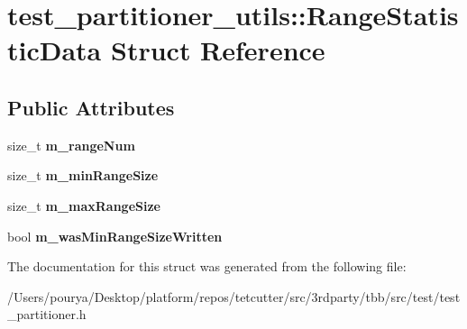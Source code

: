 \hypertarget{structtest__partitioner__utils_1_1RangeStatisticData}{}\section{test\+\_\+partitioner\+\_\+utils\+:\+:Range\+Statistic\+Data Struct Reference}
\label{structtest__partitioner__utils_1_1RangeStatisticData}
\subsection*{Public Attributes}
\begin{DoxyCompactItemize}
\item 
\hypertarget{structtest__partitioner__utils_1_1RangeStatisticData_acbd223919b9488c4636c5a5becd59654}{}size\+\_\+t {\bfseries m\+\_\+range\+Num}\label{structtest__partitioner__utils_1_1RangeStatisticData_acbd223919b9488c4636c5a5becd59654}

\item 
\hypertarget{structtest__partitioner__utils_1_1RangeStatisticData_a5c2324aa5479b0d7a06903d340089436}{}size\+\_\+t {\bfseries m\+\_\+min\+Range\+Size}\label{structtest__partitioner__utils_1_1RangeStatisticData_a5c2324aa5479b0d7a06903d340089436}

\item 
\hypertarget{structtest__partitioner__utils_1_1RangeStatisticData_a2831576fcb7505a8427563eeb9765be3}{}size\+\_\+t {\bfseries m\+\_\+max\+Range\+Size}\label{structtest__partitioner__utils_1_1RangeStatisticData_a2831576fcb7505a8427563eeb9765be3}

\item 
\hypertarget{structtest__partitioner__utils_1_1RangeStatisticData_a0f4b2f77cb266acc733774830db7b932}{}bool {\bfseries m\+\_\+was\+Min\+Range\+Size\+Written}\label{structtest__partitioner__utils_1_1RangeStatisticData_a0f4b2f77cb266acc733774830db7b932}

\end{DoxyCompactItemize}


The documentation for this struct was generated from the following file\+:\begin{DoxyCompactItemize}
\item 
/\+Users/pourya/\+Desktop/platform/repos/tetcutter/src/3rdparty/tbb/src/test/test\+\_\+partitioner.\+h\end{DoxyCompactItemize}
